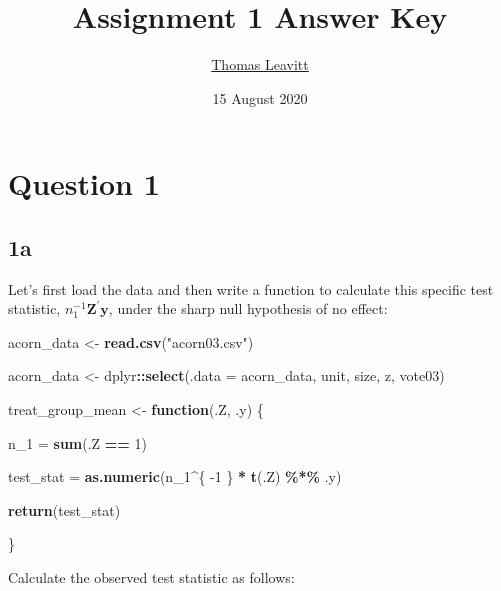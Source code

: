 \documentclass[
  12pt,
  leqno]{article}
\title{Assignment 1 Answer Key}
\author{\href{mailto:tl2624@columbia.edu}{Thomas Leavitt}}
\date{15 August 2020}
\newenvironment{Shaded}{\begin{snugshade}}{\end{snugshade}}
\newcommand{\ControlFlowTok}[1]{\textcolor[rgb]{0.13,0.29,0.53}{\textbf{#1}}}
\newcommand{\DataTypeTok}[1]{\textcolor[rgb]{0.13,0.29,0.53}{#1}}
\newcommand{\DecValTok}[1]{\textcolor[rgb]{0.00,0.00,0.81}{#1}}
\newcommand{\KeywordTok}[1]{\textcolor[rgb]{0.13,0.29,0.53}{\textbf{#1}}}
\newcommand{\NormalTok}[1]{#1}
\newcommand{\OperatorTok}[1]{\textcolor[rgb]{0.81,0.36,0.00}{\textbf{#1}}}
\newcommand{\StringTok}[1]{\textcolor[rgb]{0.31,0.60,0.02}{#1}}
\DeclareMathOperator{\1}{\mathbbm{1}}
\begin{document}
\maketitle

\section*{Question 1}

\subsection*{1a}

Let's first load the data and then write a function to calculate this
specific test statistic, \(n_1^{-1}\mathbf{Z}^{\prime}\mathbf{y}\),
under the sharp null hypothesis of no effect:

\scriptsize

\begin{Shaded}
\begin{Highlighting}[]
\NormalTok{acorn\_data \textless{}{-}}\StringTok{ }\KeywordTok{read.csv}\NormalTok{(}\StringTok{"acorn03.csv"}\NormalTok{)}

\NormalTok{acorn\_data \textless{}{-}}\StringTok{ }\NormalTok{dplyr}\OperatorTok{::}\KeywordTok{select}\NormalTok{(}\DataTypeTok{.data =}\NormalTok{ acorn\_data, unit, size, z, vote03)}

\NormalTok{treat\_group\_mean \textless{}{-}}\StringTok{ }\ControlFlowTok{function}\NormalTok{(.Z, .y) \{}
    
\NormalTok{    n\_}\DecValTok{1}\NormalTok{ =}\StringTok{ }\KeywordTok{sum}\NormalTok{(.Z }\OperatorTok{==}\StringTok{ }\DecValTok{1}\NormalTok{)}
    
\NormalTok{    test\_stat =}\StringTok{ }\KeywordTok{as.numeric}\NormalTok{(n\_}\DecValTok{1}\OperatorTok{\^{}}\NormalTok{\{}
        \DecValTok{{-}1}
\NormalTok{    \} }\OperatorTok{*}\StringTok{ }\KeywordTok{t}\NormalTok{(.Z) }\OperatorTok{\%*\%}\StringTok{ }\NormalTok{.y)}
    
    \KeywordTok{return}\NormalTok{(test\_stat)}
    
\NormalTok{\}}
\end{Highlighting}
\end{Shaded}

\normalsize

Calculate the observed test statistic as follows: \scriptsize

\begin{Shaded}
\end{Shaded}
\end{document}
